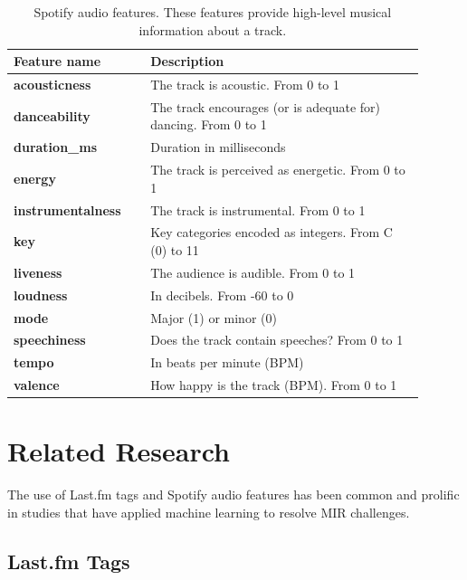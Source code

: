 \documentclass[sn-mathphys]{sn-jnl}%
\theoremstyle{thmstyleone}%
\theoremstyle{thmstyletwo}%
\theoremstyle{thmstylethree}%
\begin{document}
\begin{table}[h!]
      \centering
      \caption{Spotify audio features. These features provide high-level musical information about a track.} \label{table:spotify-features}
      \begin{tabular}{p{0.3\linewidth}p{0.6\linewidth}}
          \toprule
          \bfseries \textbf{Feature name} & \textbf{Description} \\
          \midrule
          \textbf{acousticness} & The track is acoustic. From 0 to 1 \\
          \textbf{danceability} & The track encourages (or is adequate for) dancing. From 0 to 1 \\
          \textbf{duration\_ms}  &  Duration in milliseconds \\
          \textbf{energy}  &  The track is perceived as energetic. From 0 to 1\\
          \textbf{instrumentalness}  &  The track is instrumental. From 0 to 1 \\
          \textbf{key}  &  Key categories encoded as integers. From C (0) to 11 \\
          \textbf{liveness}  &  The audience is audible. From 0 to 1\\
          \textbf{loudness}  &  In decibels. From -60 to 0 \\
          \textbf{mode}  & Major (1) or minor (0) \\
          \textbf{speechiness}  & Does the track contain speeches? From 0 to 1 \\
          \textbf{tempo}  & In beats per minute (BPM) \\
          \textbf{valence} & How happy is the track (BPM). From 0 to 1 \\
          \bottomrule
      \end{tabular}
  \end{table}


\section{Related Research}\label{sec3}

The use of Last.fm tags and Spotify audio features has been common and prolific in studies
that have applied machine learning to resolve MIR challenges.

\subsection{Last.fm Tags}
\end{document}
